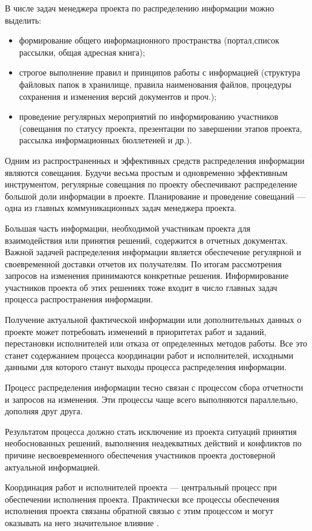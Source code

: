 В числе задач менеджера проекта по распределению информации
можно выделить:
\begin{itemize}
	\item формирование общего информационного пространства (портал,список рассылки, общая адресная книга);
	\item строгое выполнение правил и принципов работы с информацией (структура файловых папок в хранилище, правила наименования файлов, процедуры сохранения и изменения версий документов и проч.);
	\item проведение регулярных мероприятий по информированию участ­ников (совещания по статусу проекта, презентации по завершении этапов проекта, рассылка информационных бюллетеней и др.).
\end{itemize}

Одним из распространенных и эффективных средств распределе­ния информации являются совещания.
Будучи весьма простым и од­новременно эффективным инструментом, регулярные совещания по проекту обеспечивают распределение большой доли информации в проекте.
Планирование и проведение совещаний --- одна из главных коммуникационных задач менеджера проекта.

Большая часть информации, необходимой участникам проекта для взаимодействия или принятия решений, содержится в отчетных доку­ментах. Важной задачей распределения информации является обеспе­чение регулярной и своевременной доставки отчетов их получателям.
По итогам рассмотрения запросов на изменения принимаются конк­ретные решения.
Информирование участников проекта об этих реше­ниях тоже входит в число главных задач процесса распространения информации.

Получение актуальной фактической информации или дополнительных данных о проекте может потребовать изменений в приоритетах работ и заданий, перестановки исполнителей или отказа от определенных методов работы.
Все это станет содержанием процесса координации работ и исполнителей, исходными данными для которого станут вы­ходы процесса распределения информации.

Процесс распределения информации тесно связан с процессом сбо­ра отчетности и запросов на изменения.
Эти процессы чаще всего вы­полняются параллельно, дополняя друг друга.

Результатом процесса должно стать исключение из проекта ситуаций принятия необоснованных решений, выполнения неадекватных дей­ствий и конфликтов по причине несвоевременного обеспечения участ­ников проекта достоверной актуальной информацией.

Координация работ и исполнителей проекта --- центральный про­цесс при обеспечении исполнения проекта.
Практически все процессы обеспечения исполнения проекта связаны обратной связью с этим про­цессом и могут оказывать на него значительное влияние \cite[176--188]{polkovnikov}.
